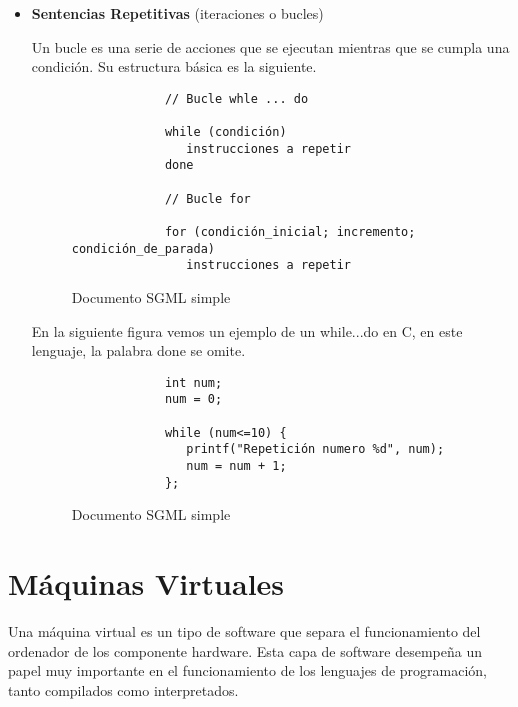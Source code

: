 \begin{itemize}
     \item \textbf{Sentencias Repetitivas} (iteraciones o bucles)

     Un bucle es una serie de acciones que se ejecutan mientras que se cumpla una condición. Su estructura básica es la siguiente.

     \begin{figure}[h]
         \begin{tcolorbox}[sharp corners, colback=yellow!30, colframe=white!20]
             \scriptsize
             \begin{verbatim}
             // Bucle whle ... do

             while (condición)
                instrucciones a repetir
             done

             // Bucle for

             for (condición_inicial; incremento; condición_de_parada)
                instrucciones a repetir
             \end{verbatim}
         \end{tcolorbox}
         \caption{Documento SGML simple}
     \end{figure}

     En la siguiente figura vemos un ejemplo de un while...do en C, en este lenguaje, la palabra done se omite.

     \begin{figure}[h]
         \begin{tcolorbox}[sharp corners, colback=yellow!30, colframe=white!20]
             \scriptsize
             \begin{verbatim}
             int num;
             num = 0;

             while (num<=10) {
                printf("Repetición numero %d", num);
                num = num + 1;
             };
             \end{verbatim}
         \end{tcolorbox}
         \caption{Documento SGML simple}
     \end{figure}

\end{itemize}

\section{Máquinas Virtuales}
Una máquina virtual es un tipo de software que separa el funcionamiento del ordenador de los componente hardware. Esta capa de software desempeña un papel muy importante en el funcionamiento de los lenguajes de programación, tanto compilados como interpretados.

